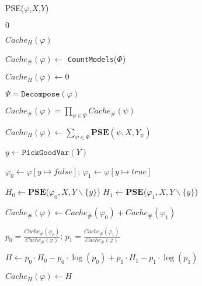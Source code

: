 \begin{algorithm}[h]
	\caption{PSE($\varphi$,$X$,$Y$)}
	\label{PSE}
	\LinesNumbered
    \DontPrintSemicolon
	 {\Return $0$}
	
	 {\Return $\mathit{Cache_H}(\varphi)$}
	
	{
		$\mathit{Cache_\#}(\varphi) \leftarrow $ \texttt{CountModels}($\Phi$) 
		
		\Return  $\mathit{Cache_H}(\varphi)  \leftarrow 0$	
	}
	
	$ \Psi = \texttt{Decompose}(\varphi) $
	
	{
		
		$Cache_\#(\varphi) = \prod_{\psi \in \Psi}{Cache_\#(\psi)}$
		
		\Return $\mathit{Cache_H}(\varphi) \leftarrow \sum_{\psi \in \Psi}{\mathbf{PSE}(\psi,X,Y_\psi)}$
	}
	
	$ y \leftarrow \texttt{PickGoodVar}(Y)$
	
	$ \varphi_0 \leftarrow \varphi[y \mapsto \mathit{false}]$; $ \varphi_1 \leftarrow  \varphi[y \mapsto \mathit{true}]$
	
	$\mathit{H}_0 \leftarrow \mathbf{PSE}$($\varphi_0,X,Y \backslash \{y\}$)\;
	$\mathit{H}_1 \leftarrow  \mathbf{PSE}$($\varphi_1,X,Y \backslash \{y\}$) 
	
	$\mathit{Cache}_\#(\varphi) \leftarrow \mathit{Cache}_\#(\varphi_0)  +  \mathit{Cache}_\#(\varphi_1)$
	
	
	$p_0 = \frac{\mathit{Cache}_\#(\varphi_0)}{\mathit{Cache}_\#(\varphi)}$; $p_1 = \frac{\mathit{Cache}_\#(\varphi_1)}{\mathit{Cache}_\#(\varphi)}$
	
	
	
	$\mathit{H} \leftarrow p_0 \cdot H_0 - p_0 \cdot \log(p_0) + p_1 \cdot H_1 - p_1 \cdot \log(p_1)$
	
	\Return $\mathit{Cache_H}(\varphi)  \leftarrow \mathit{H}$
	
\end{algorithm}


